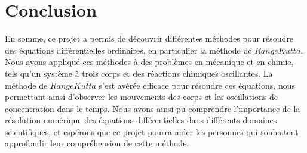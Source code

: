 \documentclass{article}
\begin{document}
\section*{Conclusion}
En somme, ce projet a permis de découvrir différentes méthodes pour résoudre des équations différentielles ordinaires, en particulier la méthode de $RangeKutta$. Nous avons appliqué ces méthodes à des problèmes en mécanique et en chimie, tels qu'un système à trois corps et des réactions chimiques oscillantes. La méthode de $RangeKutta$ s'est avérée efficace pour résoudre ces équations, nous permettant ainsi d'observer les mouvements des corps et les oscillations de concentration dans le temps. Nous avons ainsi pu comprendre l'importance de la résolution numérique des équations différentielles dans différents domaines scientifiques, et espérons que ce projet pourra aider les personnes qui souhaitent approfondir leur compréhension de cette méthode.
\end{document}
